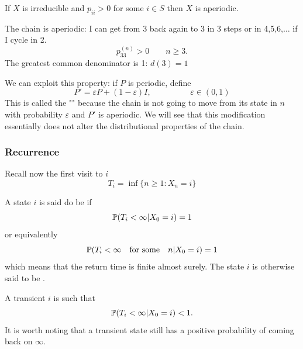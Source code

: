 \documentclass{article}
\begin{document}
\begin{proposition}
    If $X$ is irreducible and $p_{ii}>0$ for some $i \in S$ then $X$ is aperiodic.
\end{proposition}
\begin{example}
     \begin{minipage}{0.5\textwidth}
        \begin{figure}[H]
            \centering
        \end{figure}
    \end{minipage} \hfill
    \begin{minipage}{0.45\textwidth}
        The chain is aperiodic: I can get from 3 back again to 3 in 3 steps or in 4,5,6,$\ldots$ if I cycle in 2.
        \[p_{33}^{(n)}>0\qquad n\geqslant 3.\]
        The greatest common denominator is 1: $d(3)=1$
    \end{minipage}
\end{example}
We can exploit this property: if $P$ is periodic, define
\[
P'=\varepsilon P+(1-\varepsilon)I,\hspace{2cm} \varepsilon\in(0,1)
\]
This is called the "" because the chain is not going to move from its state in $n$ with probability $\varepsilon$ and $P'$ is aperiodic. We will see that this modification essentially does not alter the distributional properties of the chain. 
\subsubsection{Recurrence}
Recall now the first visit to $i$
\[
T_i=\inf\{n\geqslant 1: X_n=i\}
\]

\begin{definition}
    A state $i$ is said do be  if \[\mathbb{P}(T_i<\infty|X_0=i)=1\]  or equivalently \[\mathbb{P}(T_i<\infty \quad\text{for some}\quad n|X_0=i)=1\] which means that the return time is finite almost surely. The state $i$ is otherwise said to be .
\end{definition}
A transient $i$ is such that \[\mathbb{P}(T_i<\infty|X_0=i)<1.\]It is worth noting that a transient state still has a positive probability of coming back on $\infty$.
\end{document}
